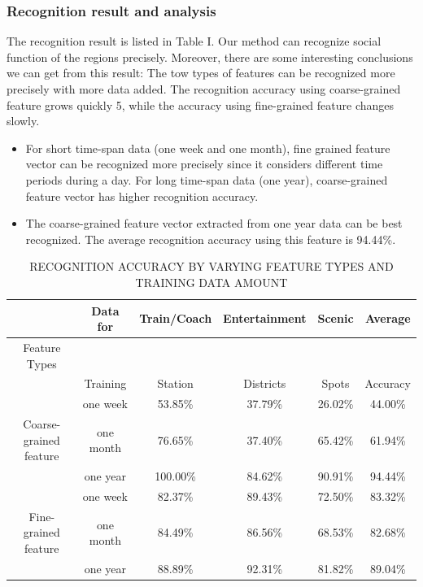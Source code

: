 \documentclass[a4paper, 10pt, conference]{ieeeconf}      %
\begin{document}
\subsubsection{ Recognition result and analysis}The recognition result is listed in Table I. Our method can recognize social function of the regions precisely. Moreover, there are some interesting conclusions we can get from this result: The tow types of features can be recognized more precisely with more data added. The recognition accuracy using coarse-grained feature grows quickly 5, while the accuracy using fine-grained feature changes slowly.

\begin{itemize}
\item For short time-span data (one week and one month), fine grained feature vector can be recognized more precisely since it considers different time periods during a day. For long time-span data (one year), coarse-grained feature vector has higher recognition accuracy.
\item The coarse-grained feature vector extracted from one year data can be best recognized. The average recognition accuracy using this feature is 94.44\%.

\end{itemize}

\begin{table}[h] %
\centering
\caption{RECOGNITION ACCURACY BY VARYING FEATURE TYPES AND TRAINING DATA AMOUNT} %
\begin{tabular}{c|c|c|c|c|c}
	\hline 
	& Data for & Train/Coach & Entertainment & Scenic & Average \\ 
	\hline 
	Feature Types &  &  &  &  &  \\ 
	& Training & Station & Districts & Spots & Accuracy \\ 

	\hline 
	 & one week & 53.85\% & 37.79\% & 26.02\% & 44.00\% \\ 

	Coarse-grained feature & one month & 76.65\% & 37.40\% & 65.42\% & 61.94\% \\ 
 
	& one year & 100.00\% & 84.62\% & 90.91\% & 94.44\% \\ 
	\hline 
	& one week & 82.37\% & 89.43\% & 72.50\% & 83.32\% \\ 

	Fine-grained feature & one month & 84.49\% & 86.56\% & 68.53\% & 82.68\% \\ 

	& one year & 88.89\% & 92.31\% & 81.82\% & 89.04\% \\ 
	\hline 

\end{tabular} 
\end{table}
\end{document}
